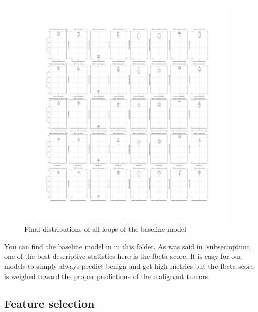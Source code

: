 \documentclass[12pt, a4paper]{article}
\begin{document}
\begin{figure}[H]
    \begin{center}
        \includegraphics[width=0.95\textwidth]{figures/RNCV/Baseline/All loop outer folds boxplots.png}
        \caption{Final distributions of all loops of the baseline model}\label{fig:Baseline descriptive statistics}
    \end{center}
\end{figure}

\begin{multicols}{2}

    You can find the baseline model in \href{https://github.com/ArisPodotas/Assignment-2-MLICB/tree/master/models/Baseline}{in this folder}. As was said in \ref{subsec:optuna} one of the best descriptive statistics here is the fbeta score. It is easy for our models to simply always predict benign and get high metrics but the fbeta score is weighed toward the proper predictions of the malignant tumors.
    \newline

    \subsection{Feature selection} \label{subsec:fs}

\end{multicols}
\end{document}
